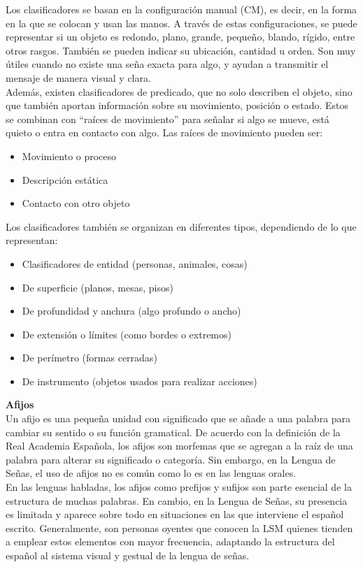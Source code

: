 Los clasificadores se basan en la configuración manual (CM), es decir, en la forma en la que se colocan y usan las manos. A través de estas configuraciones, se puede representar si un objeto es redondo, plano, grande, pequeño, blando, rígido, entre otros rasgos. También se pueden indicar su ubicación, cantidad u orden. Son muy útiles cuando no existe una seña exacta para algo, y ayudan a transmitir el mensaje de manera visual y clara.\\

Además, existen clasificadores de predicado, que no solo describen el objeto, sino que también aportan información sobre su movimiento, posición o estado. Estos se combinan con “raíces de movimiento” para señalar si algo se mueve, está quieto o entra en contacto con algo. Las raíces de movimiento pueden ser:
\begin{itemize}
    \item Movimiento o proceso
    \item Descripción estática
    \item Contacto con otro objeto
\end{itemize}

Los clasificadores también se organizan en diferentes tipos, dependiendo de lo que representan:
\begin{itemize}
    \item Clasificadores de entidad (personas, animales, cosas)
    \item De superficie (planos, mesas, pisos)
    \item De profundidad y anchura (algo profundo o ancho)
    \item De extensión o límites (como bordes o extremos)
    \item De perímetro (formas cerradas)
    \item De instrumento (objetos usados para realizar acciones) 
\end{itemize}

\textbf{Afijos}\\
Un afijo es una pequeña unidad con significado que se añade a una palabra para cambiar su sentido o su función gramatical. De acuerdo con la definición de la Real Academia Española, los afijos son morfemas que se agregan a la raíz de una palabra para alterar su significado o categoría. Sin embargo, en la Lengua de Señas, el uso de afijos no es común como lo es en las lenguas orales.\\

En las lenguas habladas, los afijos como prefijos y sufijos son parte esencial de la estructura de muchas palabras. En cambio, en la Lengua de Señas, su presencia es limitada y aparece sobre todo en situaciones en las que interviene el español escrito. Generalmente, son personas oyentes que conocen la LSM quienes tienden a emplear estos elementos con mayor frecuencia, adaptando la estructura del español al sistema visual y gestual de la lengua de señas.\\

